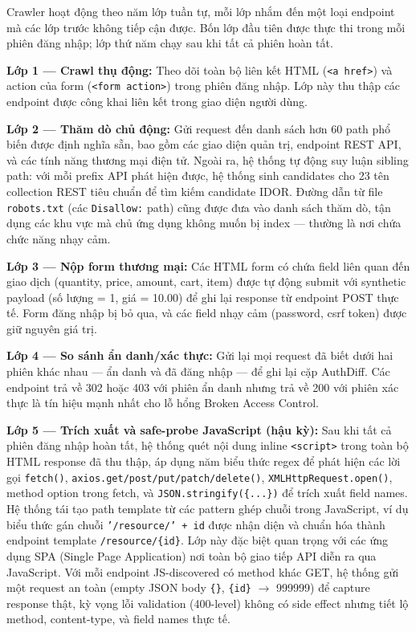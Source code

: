 Crawler hoạt động theo năm lớp tuần tự, mỗi lớp nhắm đến một loại endpoint mà các lớp trước không tiếp cận được. Bốn lớp đầu tiên được thực thi trong mỗi phiên đăng nhập; lớp thứ năm chạy sau khi tất cả phiên hoàn tất.

\textbf{Lớp 1 --- Crawl thụ động:} Theo dõi toàn bộ liên kết HTML (\texttt{<a href>}) và action của form (\texttt{<form action>}) trong phiên đăng nhập. Lớp này thu thập các endpoint được công khai liên kết trong giao diện người dùng.

\textbf{Lớp 2 --- Thăm dò chủ động:} Gửi request đến danh sách hơn 60 path phổ biến được định nghĩa sẵn, bao gồm các giao diện quản trị, endpoint REST API, và các tính năng thương mại điện tử. Ngoài ra, hệ thống tự động suy luận sibling path: với mỗi prefix API phát hiện được, hệ thống sinh candidates cho 23 tên collection REST tiêu chuẩn để tìm kiếm candidate IDOR. Đường dẫn từ file \texttt{robots.txt} (các \texttt{Disallow:} path) cũng được đưa vào danh sách thăm dò, tận dụng các khu vực mà chủ ứng dụng không muốn bị index --- thường là nơi chứa chức năng nhạy cảm.

\textbf{Lớp 3 --- Nộp form thương mại:} Các HTML form có chứa field liên quan đến giao dịch (quantity, price, amount, cart, item) được tự động submit với synthetic payload (số lượng = 1, giá = 10.00) để ghi lại response từ endpoint POST thực tế. Form đăng nhập bị bỏ qua, và các field nhạy cảm (password, csrf token) được giữ nguyên giá trị.

\textbf{Lớp 4 --- So sánh ẩn danh/xác thực:} Gửi lại mọi request đã biết dưới hai phiên khác nhau --- ẩn danh và đã đăng nhập --- để ghi lại cặp AuthDiff. Các endpoint trả về 302 hoặc 403 với phiên ẩn danh nhưng trả về 200 với phiên xác thực là tín hiệu mạnh nhất cho lỗ hổng Broken Access Control.

\textbf{Lớp 5 --- Trích xuất và safe-probe JavaScript (hậu kỳ):} Sau khi tất cả phiên đăng nhập hoàn tất, hệ thống quét nội dung inline \texttt{<script>} trong toàn bộ HTML response đã thu thập, áp dụng năm biểu thức regex để phát hiện các lời gọi \texttt{fetch()}, \texttt{axios.get/post/put/patch/delete()}, \texttt{XMLHttpRequest.open()}, method option trong fetch, và \texttt{JSON.stringify(\{...\})} để trích xuất field names. Hệ thống tái tạo path template từ các pattern ghép chuỗi trong JavaScript, ví dụ biểu thức gán chuỗi \texttt{'/resource/' + id} được nhận diện và chuẩn hóa thành endpoint template \texttt{/resource/\{id\}}. Lớp này đặc biệt quan trọng với các ứng dụng SPA (Single Page Application) nơi toàn bộ giao tiếp API diễn ra qua JavaScript. Với mỗi endpoint JS-discovered có method khác GET, hệ thống gửi một request an toàn (empty JSON body \texttt{\{\}}, \texttt{\{id\}} $\rightarrow$ 999999) để capture response thật, kỳ vọng lỗi validation (400-level) không có side effect nhưng tiết lộ method, content-type, và field names thực tế.

